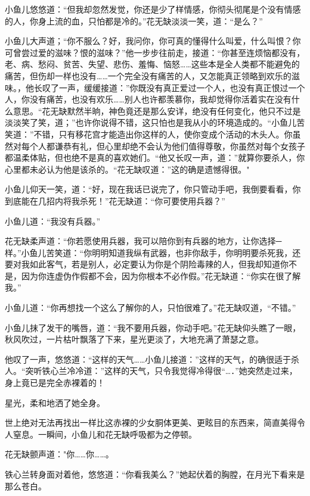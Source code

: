 \documentclass[12pt,oneside]{book}
\begin{document}
小鱼儿悠悠道：``但我却忽然发觉，你还是少了样情感，你彻头彻尾是个没有情感的人，你身上流的血，只怕都是冷的。''花无缺淡淡一笑，道：``是么？''

小鱼儿大声道；``你不服么？好，我问你，你可真的懂得什么叫爱，什么叫恨？你可曾尝过爱的滋味？恨的滋味？''他一步步往前走，接道：``你甚至连烦恼都没有，老、病、愁闷、贫苦、失望、悲伤、羞悔、恼怒\ldots\ldots 这些本是全人类都不能避免的痛苦，但伤却一样也没有\ldots\ldots 一个完全没有痛苦的人，又怎能真正领略到欢乐的滋味。，他长叹了一声，缓缓接道：''你既没有真正爱过一个人，也没有真正恨过一个人，你没有痛苦，也没有欢乐\ldots\ldots 别人也许都羡慕你，我却觉得你活着实在没有什么意思。``花无缺默然半晌，神色竟还是那么安详，绝没有任何变化，他只不过是淡淡笑了笑，道；''也许你说得不错，这只怕也是我从小的环境造成的。``小鱼儿苦笑道：''不错，只有移花宫才能造出你这样的人，使你变成个活动的木头人。你虽然对每个人都谦恭有礼，但心里却绝不会认为他们值得尊敬，你虽然对每个女孩子都温柔体贴，但也绝不是真的喜欢她们。``他又长叹一声，道：''就算你要杀人，你心里都未必认为他是该杀的。``花无缺叹道：''这的确是遗憾得很。"

小鱼儿仰天一笑，道：``好，现在我话已说完了，你只管动手吧，我倒要看看，你到底能在几招内将我杀死！''花无缺道：``你可要使用兵器？''

小鱼儿道：``我没有兵器。''

花无缺柔声道：``你若愿使用兵器，我可以陪你到有兵器的地方，让你选择─样。''小鱼儿苦笑道：``你明明知道我纵有武器，也非你敌手，你明明要杀死我，还要对我如此客气，若是别人，必定要认为你是个阴险毒辣的人，但我却知道你不是，因为你连虚伪作假都不会，因为你根本不必作假。''花无缺道：``你实在很了解我。''

小鱼儿道：``你再想找一个这么了解你的人，只怕很难了。''花无缺叹道，``不错。''

小鱼儿抹了发干的嘴唇，道：``我不要用兵器，你动手吧。''花无缺仰头瞧了一眼，秋风吹过，一片枯叶飘落了下来，星光更淡了，大地充满了萧瑟之意。

他叹了一声，悠悠道：``这样的天气\ldots\ldots 小鱼儿接道：''这样的天气，的确很适于杀人。``突听铁心兰冷冷道：''这样的天气，只令我觉得冷得很``\ldots．''她突然走过来，身上竟已是完全赤裸着的！

星光，柔和地洒了她全身。

世上绝对无法再找出一样比这赤裸的少女胴体更美、更眩目的东西来，简直美得令人窒息。一瞬间，小鱼儿和花无缺呼吸都为之停顿。

花无缺颤声道："你\ldots\ldots 你\ldots\ldots。

铁心兰转身面对着他，悠悠道：``你看我美么？''她起伏着的胸膛，在月光下看来是那么苍白。
\end{document}
